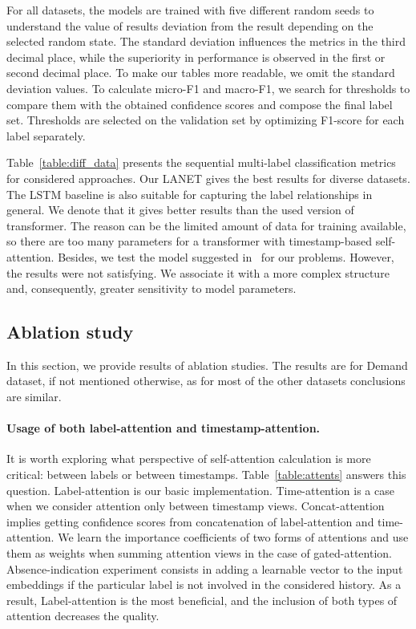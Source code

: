 \documentclass[runningheads]{llncs}
\begin{document}
For all datasets, the models are trained with five different random seeds to understand the value of results deviation from the result depending on the selected random state. The standard deviation influences the metrics in the third decimal place, while the superiority in performance is observed in the first or second decimal place. To make our tables more readable, we omit the standard deviation values.
To calculate micro-F1 and macro-F1, we search for thresholds to compare them with the obtained confidence scores and compose the final label set. Thresholds are selected on the validation set by optimizing F1-score for each label separately. 

 
Table~\ref{table:diff_data} presents the sequential multi-label classification metrics for considered approaches.
Our LANET gives the best results for diverse datasets. 
The LSTM baseline is also suitable for capturing the label relationships in general. We denote that it gives better results than the used version of transformer.
The reason can be the limited amount of data for training available, so there are too many parameters for a transformer with timestamp-based self-attention. Besides, we test the model suggested in~\cite{shou2023concurrent} for our problems. However, the results were not satisfying. We associate it with a more complex structure and, consequently, greater sensitivity to model parameters. 


 
\subsection{Ablation study}
\label{sec:qual}

In this section, we provide results of ablation studies. 
The results are for Demand dataset, if not mentioned otherwise, as for most of the other datasets conclusions are similar.

\paragraph{\textbf{Usage of both label-attention and timestamp-attention.}}
It is worth exploring what perspective of self-attention calculation is more critical: between labels or between timestamps.
Table~\ref{table:attents} answers this question.
Label-attention is our basic implementation. Time-attention is a case when we consider attention only between timestamp views. Concat-attention implies getting confidence scores from concatenation of label-attention and time-attention. We learn the importance coefficients of two forms of attentions and use them as weights when summing attention views in the case of gated-attention. Absence-indication experiment consists in adding a learnable vector to the input embeddings if the particular label is not involved in the considered history.
As a result, Label-attention is the most beneficial, and the inclusion of both types of attention decreases the quality.
\end{document}
